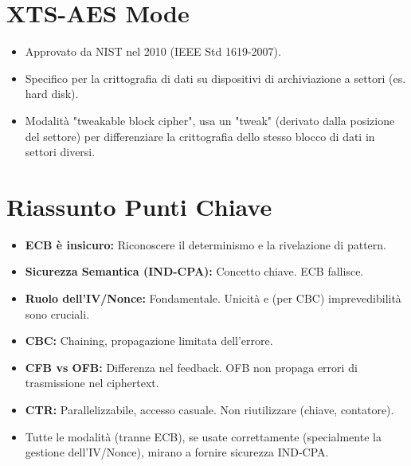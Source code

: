 \section{XTS-AES Mode}
\begin{itemize}
    \item Approvato da NIST nel 2010 (IEEE Std 1619-2007).
    \item Specifico per la crittografia di dati su dispositivi di archiviazione a settori (es. hard disk).
    \item Modalità "tweakable block cipher", usa un "tweak" (derivato dalla posizione del settore) per differenziare la crittografia dello stesso blocco di dati in settori diversi.
\end{itemize}

\section{Riassunto Punti Chiave}
\begin{itemize}
    \item \textbf{ECB è insicuro:} Riconoscere il determinismo e la rivelazione di pattern.
    \item \textbf{Sicurezza Semantica (IND-CPA):} Concetto chiave. ECB fallisce.
    \item \textbf{Ruolo dell'IV/Nonce:} Fondamentale. Unicità e (per CBC) imprevedibilità sono cruciali.
    \item \textbf{CBC:} Chaining, propagazione limitata dell'errore.
    \item \textbf{CFB vs OFB:} Differenza nel feedback. OFB non propaga errori di trasmissione nel ciphertext.
    \item \textbf{CTR:} Parallelizzabile, accesso casuale. Non riutilizzare (chiave, contatore).
    \item Tutte le modalità (tranne ECB), se usate correttamente (specialmente la gestione dell'IV/Nonce), mirano a fornire sicurezza IND-CPA.
\end{itemize}

